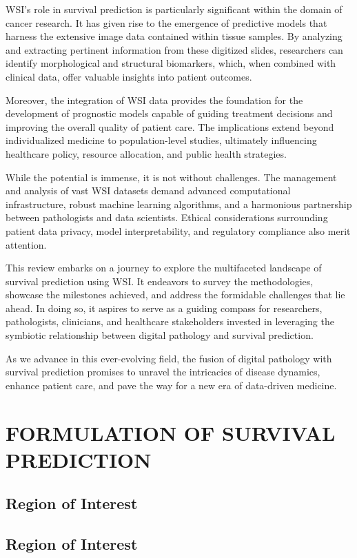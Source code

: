 \documentclass[journal,twoside,web]{ieeecolor}
\begin{document}
WSI's role in survival prediction is particularly significant within the domain of cancer research. It has given rise to the emergence of predictive models that harness the extensive image data contained within tissue samples. By analyzing and extracting pertinent information from these digitized slides, researchers can identify morphological and structural biomarkers, which, when combined with clinical data, offer valuable insights into patient outcomes.

Moreover, the integration of WSI data provides the foundation for the development of prognostic models capable of guiding treatment decisions and improving the overall quality of patient care. The implications extend beyond individualized medicine to population-level studies, ultimately influencing healthcare policy, resource allocation, and public health strategies.

While the potential is immense, it is not without challenges. The management and analysis of vast WSI datasets demand advanced computational infrastructure, robust machine learning algorithms, and a harmonious partnership between pathologists and data scientists. Ethical considerations surrounding patient data privacy, model interpretability, and regulatory compliance also merit attention.

This review embarks on a journey to explore the multifaceted landscape of survival prediction using WSI. It endeavors to survey the methodologies, showcase the milestones achieved, and address the formidable challenges that lie ahead. In doing so, it aspires to serve as a guiding compass for researchers, pathologists, clinicians, and healthcare stakeholders invested in leveraging the symbiotic relationship between digital pathology and survival prediction.

As we advance in this ever-evolving field, the fusion of digital pathology with survival prediction promises to unravel the intricacies of disease dynamics, enhance patient care, and pave the way for a new era of data-driven medicine.

\section{FORMULATION OF SURVIVAL PREDICTION}
\subsection{Region of Interest}

\subsection{Region of Interest}
\end{document}
